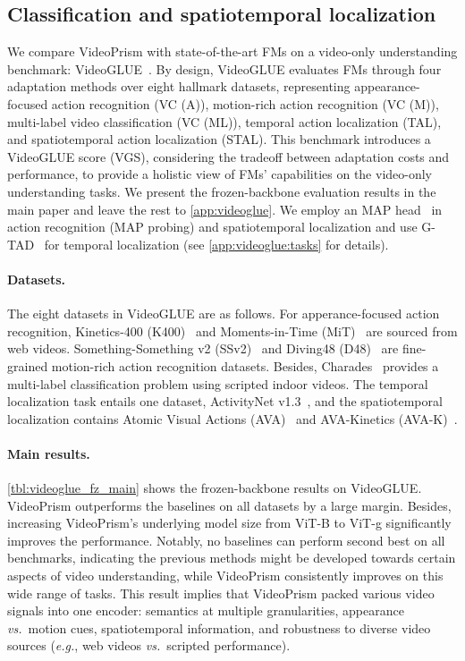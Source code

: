 \documentclass{article}
\theoremstyle{plain}
\theoremstyle{definition}
\theoremstyle{remark}
\newcommand{\OURS}{VideoPrism\xspace}
\newcommand{\eg}{\textit{e.g.}\xspace}
\newcommand{\myparagraph}[1]{\paragraph{#1}}
\begin{document}
\subsection{Classification and spatiotemporal localization}
\label{sec:exp:videoglue}

We compare \OURS with state-of-the-art FMs on a video-only understanding benchmark: VideoGLUE~\cite{yuan2023videoglue}.
By design, VideoGLUE evaluates FMs through four adaptation methods over eight hallmark datasets, representing appearance-focused action recognition (VC (A)), motion-rich action recognition (VC (M)), multi-label video classification (VC (ML)), temporal action localization (TAL), and spatiotemporal action localization (STAL). 
This benchmark introduces a VideoGLUE score (VGS), considering the tradeoff between adaptation costs and performance, to provide a holistic view of FMs' capabilities on the video-only understanding tasks.
We present the frozen-backbone evaluation results in the main paper and leave the rest to \cref{app:videoglue}. We employ an MAP head~\cite{yuan2023videoglue} in action recognition (MAP probing) and spatiotemporal localization and use G-TAD~\cite{xu2019gtad} for temporal localization (see \cref{app:videoglue:tasks} for details).



\myparagraph{Datasets.}
The eight datasets in VideoGLUE are as follows. For apperance-focused action recognition, Kinetics-400 (K400)~\cite{kay2017kinetics} and Moments-in-Time (MiT)~\cite{monfort2019moments} are sourced from web videos. Something-Something v2 (SSv2)~\cite{goyal2017something} and Diving48 (D48)~\cite{li2018resound} are fine-grained motion-rich action recognition datasets. Besides, Charades~\cite{sigurdsson2016hollywood} provides a multi-label classification problem using scripted indoor videos. The temporal localization task entails one dataset, ActivityNet v1.3~\cite{caba2015activitynet}, and the spatiotemporal localization contains Atomic Visual Actions (AVA)~\cite{gu2018ava} and AVA-Kinetics (AVA-K)~\cite{li2020ava}.



\myparagraph{Main results.}
\cref{tbl:videoglue_fz_main} shows the frozen-backbone results on VideoGLUE.
\OURS outperforms the baselines on all datasets by a large margin. Besides, increasing VideoPrism's underlying model size from ViT-B to ViT-g significantly improves the performance. Notably, no baselines can perform second best on all benchmarks, indicating the previous methods might be developed towards certain aspects of video understanding, while \OURS consistently improves on this wide range of tasks. This result implies that \OURS packed various video signals into one encoder: semantics at multiple granularities, appearance \textit{vs.}\ motion cues, spatiotemporal information, and robustness to diverse video sources (\eg, web videos \textit{vs.}\ scripted performance). 
\end{document}
